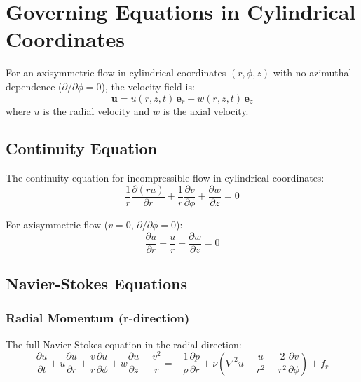 
\section{Governing Equations in Cylindrical Coordinates}

For an axisymmetric flow in cylindrical coordinates $(r, \phi, z)$ with no azimuthal dependence ($\partial/\partial\phi = 0$), the velocity field is:
\begin{equation}
    \mathbf{u} = u(r,z,t)\,\mathbf{e}_r + w(r,z,t)\,\mathbf{e}_z
\end{equation}
where $u$ is the radial velocity and $w$ is the axial velocity.

\subsection{Continuity Equation}

The continuity equation for incompressible flow in cylindrical coordinates:
\begin{equation}
    \frac{1}{r}\frac{\partial (ru)}{\partial r} + \frac{1}{r}\frac{\partial v}{\partial \phi} + \frac{\partial w}{\partial z} = 0
\end{equation}

For axisymmetric flow ($v = 0$, $\partial/\partial\phi = 0$):
\begin{equation}
    \boxed{\frac{\partial u}{\partial r} + \frac{u}{r} + \frac{\partial w}{\partial z} = 0}
\end{equation}

\subsection{Navier-Stokes Equations}

\subsubsection{Radial Momentum (r-direction)}

The full Navier-Stokes equation in the radial direction:
\begin{equation}
    \frac{\partial u}{\partial t} + u\frac{\partial u}{\partial r} + \frac{v}{r}\frac{\partial u}{\partial \phi} + w\frac{\partial u}{\partial z} - \frac{v^2}{r} = -\frac{1}{\rho}\frac{\partial p}{\partial r} + \nu\left(\nabla^2 u - \frac{u}{r^2} - \frac{2}{r^2}\frac{\partial v}{\partial \phi}\right) + f_r
\end{equation}


